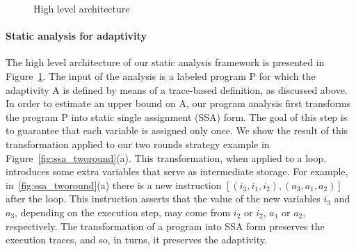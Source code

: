 \begin{figure}
    \centering    
    \vspace{-0.2cm}
   \caption{High level architecture}
    \label{fig:structure}
    \vspace{-0.5cm}
\end{figure}

\paragraph{Static analysis for adaptivity}
The high level architecture of our static analysis framework is presented in 
 Figure~\ref{fig:structure}. The input of the analysis is a labeled program P for which the adaptivity A is defined by means of a trace-based definition, as discussed above. In order to estimate an upper bound on A, our program analysis first transforms the program P into static single assignment (SSA) form. The goal of this step is to guarantee that each variable is assigned only once. We show the result of this transformation applied to our two rounds strategy example in Figure~\ref{fig:ssa_tworound}(a). 
 This transformation, when applied to a loop, introduces some extra variables that serve as intermediate storage. For example, in~\ref{fig:ssa_tworound}(a) there is a new instruction $[(i_3,i_1,i_2),(a_3,a_1,a_2)]$ after the loop. This instruction asserts that the value of the new variables $i_3$ and $a_3$, depending on the execution step, may come from $i_2$ or $i_2$, $a_1$ or $a_2$, respectively. The transformation of a program into SSA form preserves the execution traces, and so, in turns, it preserves the adaptivity. 

